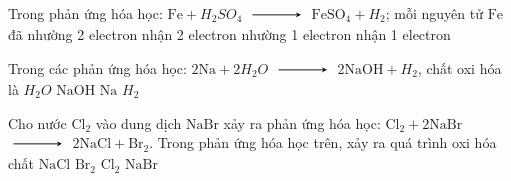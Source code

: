 \begin{ex}
	Trong phản ứng hóa học: $\mathrm{Fe}+H_2SO_4$ $\xrightarrow$ $ \mathrm{FeSO}_4+H_2$; mỗi nguyên tử $\mathrm{Fe}$ đã
	\choice
	{\True nhường 2 electron}
	{nhận 2 electron}
	{nhường 1 electron}
	{nhận 1 electron}
\end{ex}
\begin{ex}
	Trong các phản ứng hóa học: $2\mathrm{Na}+2H_2O$ $\xrightarrow$ $ 2\mathrm{NaOH}+H_2$, chất oxi hóa là
	\choice
	{\True $H_2O$}
	{$\mathrm{NaOH}$}
	{$\mathrm{Na}$}
	{$H_2$}
\end{ex}
\begin{ex}
	Cho nước $\mathrm{Cl}_2$ vào dung dịch $\mathrm{NaBr}$ xảy ra phản ứng hóa học: $\mathrm{Cl}_2+2\mathrm{NaBr} $ $\xrightarrow$ $ 2\mathrm{NaCl}+\mathrm{Br}_2$. Trong phản ứng hóa học trên, xảy ra quá trình oxi hóa chất
	\choice
	{$\mathrm{NaCl}$}
	{$\mathrm{Br}_2$}
	{$\mathrm{Cl}_2$}
	{\True $\mathrm{NaBr}$}
\end{ex}

